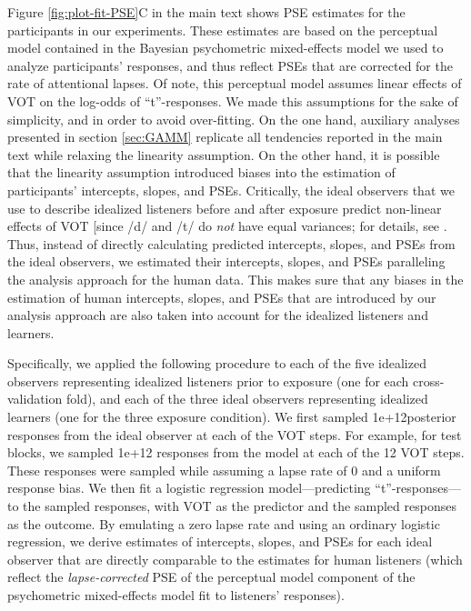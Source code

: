 \documentclass[
  11pt,
  man,mask,floatsintext]{apa6}
\begin{document}
Figure \ref{fig:plot-fit-PSE}C in the main text shows PSE estimates for the participants in our experiments. These estimates are based on the perceptual model contained in the Bayesian psychometric mixed-effects model we used to analyze participants' responses, and thus reflect PSEs that are corrected for the rate of attentional lapses. Of note, this perceptual model assumes linear effects of VOT on the log-odds of ``t''-responses. We made this assumptions for the sake of simplicity, and in order to avoid over-fitting. On the one hand, auxiliary analyses presented in section \ref{sec:GAMM} replicate all tendencies reported in the main text while relaxing the linearity assumption. On the other hand, it is possible that the linearity assumption introduced biases into the estimation of participants' intercepts, slopes, and PSEs. Critically, the ideal observers that we use to describe idealized listeners before and after exposure predict non-linear effects of VOT {[}since /d/ and /t/ do \emph{not} have equal variances; for details, see \autocite{bicknell2024,kleinschmidt-jaeger2015,kronrod2016}. Thus, instead of directly calculating predicted intercepts, slopes, and PSEs from the ideal observers, we estimated their intercepts, slopes, and PSEs paralleling the analysis approach for the human data. This makes sure that any biases in the estimation of human intercepts, slopes, and PSEs that are introduced by our analysis approach are also taken into account for the idealized listeners and learners.

Specifically, we applied the following procedure to each of the five idealized observers representing idealized listeners prior to exposure (one for each cross-validation fold), and each of the three ideal observers representing idealized learners (one for the three exposure condition). We first sampled 1e+12posterior responses from the ideal observer at each of the VOT steps. For example, for test blocks, we sampled 1e+12 responses from the model at each of the 12 VOT steps. These responses were sampled while assuming a lapse rate of 0 and a uniform response bias. We then fit a logistic regression model---predicting ``t''-responses---to the sampled responses, with VOT as the predictor and the sampled responses as the outcome. By emulating a zero lapse rate and using an ordinary logistic regression, we derive estimates of intercepts, slopes, and PSEs for each ideal observer that are directly comparable to the estimates for human listeners (which reflect the \emph{lapse-corrected} PSE of the perceptual model component of the psychometric mixed-effects model fit to listeners' responses).
\end{document}
